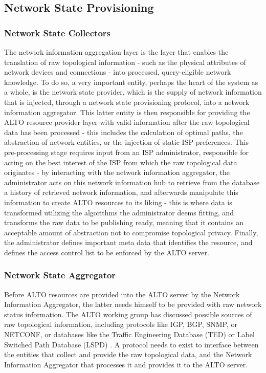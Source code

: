 \subsection{Network State Provisioning}

\subsubsection{Network State Collectors}

    The network information aggregation layer is the layer that enables the translation of raw topological information - such as the physical attributes of network devices and connections - into processed, query-eligible network knowledge.
    To do so, a very important entity, perhaps the heart of the system as a whole, is the network state provider, which is the supply of network information that is injected, through a network state provisioning protocol, into a network information aggregator.
    This latter entity is then responsible for providing the ALTO resource provider layer with valid information after the raw topological data has been processed - this includes the calculation of optimal paths, the abstraction of network entities, or the injection of static ISP preferences.
    This pre-processing stage requires input from an ISP administrator, responsible for acting on the best interest of the ISP from which the raw topological data originates - by interacting with the network information aggregator, the administrator acts on this network information hub to retrieve from the database a history of retrieved network information, and afterwards manipulate this information to create ALTO resources to its liking - this is where data is transformed utilizing the algorithms the administrator deems fitting, and transforms the raw data to be publishing ready, meaning that it contains an acceptable amount of abstraction not to compromise topological privacy.
    Finally, the administrator defines important meta data that identifies the resource, and defines the access control list to be enforced by the ALTO server.

\subsubsection{Network State Aggregator}

    Before ALTO resources are provided into the ALTO server by the Network Information Aggregator, the latter needs himself to be provided with raw network status information.
    The ALTO working group has discussed possible sources of raw topological information, including protocols like IGP, BGP, SNMP, or NETCONF, or databases like the Traffic Engineering Database (TED) or Label Switched Path Database (LSPD) \cite{alto-deployment-considerations}.
    A protocol needs to exist to interface between the entities that collect and provide the raw topological data, and the Network Information Aggregator that processes it and provides it to the ALTO server.

